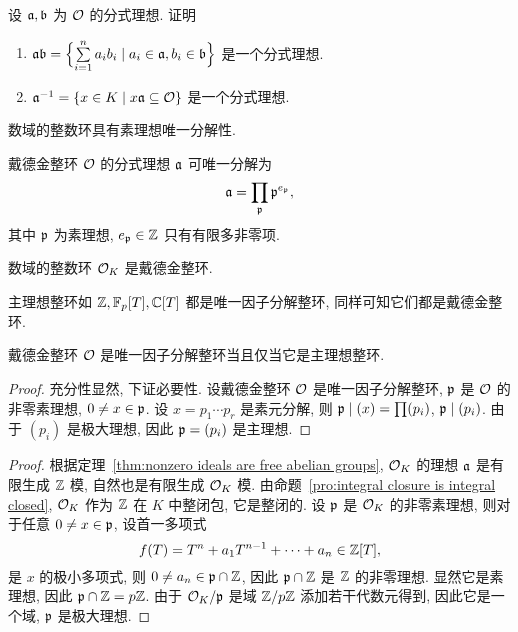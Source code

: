 \begin{exercise}
	设 ${\mathfrak{a}},{\mathfrak{b}}$ 为 ${\mathcal{O}}$ 的分式理想. 证明
	\begin{enumerate}
		\item ${\mathfrak{a}}{\mathfrak{b}}=\Bigl\{\sum\limits_{i=1}^n a_ib_i\mid a_i\in{\mathfrak{a}},b_i\in{\mathfrak{b}}\Bigr\}$ 是一个分式理想.
		\item ${\mathfrak{a}}^{-1}=\left\{x\in K\mid x{\mathfrak{a}}\subseteq{\mathcal{O}}\right\}$ 是一个分式理想.
	\end{enumerate}
\end{exercise}

\begin{corollary}{}{}
	数域的整数环具有素理想唯一分解性.
\end{corollary}

\begin{corollary}{}{}
	戴德金整环 ${\mathcal{O}}$ 的分式理想 ${\mathfrak{a}}$ 可唯一分解为
	\[{\mathfrak{a}}=\prod_{{\mathfrak{p}}}{\mathfrak{p}}^{e_{\mathfrak{p}}},\]
	其中 ${\mathfrak{p}}$ 为素理想, $e_{\mathfrak{p}}\in{\mathbb{Z}}$ 只有有限多非零项.
\end{corollary}

\begin{theorem}{}{}
	数域的整数环 ${\mathcal{O}}_K$ 是戴德金整环.
\end{theorem}

主理想整环如 ${\mathbb{Z}},{\mathbb{F}}_p[T],{\mathbb{C}}[T]$ 都是唯一因子分解整环, 同样可知它们都是戴德金整环.

\begin{corollary}{}{}
	戴德金整环 ${\mathcal{O}}$ 是唯一因子分解整环当且仅当它是主理想整环.
\end{corollary}

\begin{proof}
	充分性显然, 下证必要性.
	设戴德金整环 ${\mathcal{O}}$ 是唯一因子分解整环, ${\mathfrak{p}}$ 是 ${\mathcal{O}}$ 的非零素理想, $0\neq x\in{\mathfrak{p}}$. 设 $x=p_1\cdots p_r$ 是素元分解, 则 ${\mathfrak{p}}\mid (x)=\prod (p_i)$, ${\mathfrak{p}}\mid(p_i)$. 由于 $(p_i)$ 是极大理想, 因此 ${\mathfrak{p}}=(p_i)$ 是主理想.
\end{proof}

\begin{proof}
	根据定理~\ref{thm:nonzero ideals are free abelian groups}, ${\mathcal{O}}_K$ 的理想 ${\mathfrak{a}}$ 是有限生成 ${\mathbb{Z}}$ 模, 自然也是有限生成 ${\mathcal{O}}_K$ 模. 由命题~\ref{pro:integral closure is integral closed}, ${\mathcal{O}}_K$ 作为 ${\mathbb{Z}}$ 在 $K$ 中整闭包, 它是整闭的. 设 ${\mathfrak{p}}$ 是 ${\mathcal{O}}_K$ 的非零素理想, 则对于任意 $0\neq x\in{\mathfrak{p}}$, 设首一多项式
	\[f(T)=T^n+a_1T^{n-1}+\dots+a_n\in{\mathbb{Z}}[T],\]
	是 $x$ 的极小多项式, 则 $0\neq a_n\in{\mathfrak{p}}\cap {\mathbb{Z}}$, 因此 ${\mathfrak{p}}\cap {\mathbb{Z}}$ 是 ${\mathbb{Z}}$ 的非零理想.
	显然它是素理想, 因此 ${\mathfrak{p}}\cap{\mathbb{Z}}=p{\mathbb{Z}}$.
	由于 ${\mathcal{O}}_K/{\mathfrak{p}}$ 是域 ${\mathbb{Z}}/p{\mathbb{Z}}$ 添加若干代数元得到, 因此它是一个域, ${\mathfrak{p}}$ 是极大理想.
\end{proof}

